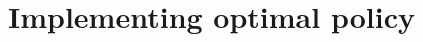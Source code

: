 \documentclass[10pt]{beamer}
\DeclareMathOperator{\E}{\mathbb{E}}
\begin{document}
%	
%	
%
%
%
%
%
%
%
%
%
%
%
%
%



\section{Implementing optimal policy}
\end{document}
